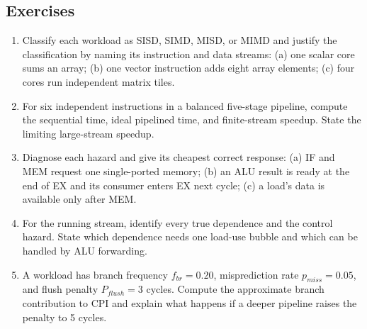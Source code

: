 \documentclass[11pt]{article}
\begin{document}
\subsection*{Exercises}
\begin{enumerate}
  \item Classify each workload as SISD, SIMD, MISD, or MIMD and justify the
        classification by naming its instruction and data streams: (a) one
        scalar core sums an array; (b) one vector instruction adds eight array
        elements; (c) four cores run independent matrix tiles.
  \item For six independent instructions in a balanced five-stage pipeline,
        compute the sequential time, ideal pipelined time, and finite-stream
        speedup. State the limiting large-stream speedup.
  \item Diagnose each hazard and give its cheapest correct response: (a) IF
        and MEM request one single-ported memory; (b) an ALU result is ready at
        the end of EX and its consumer enters EX next cycle; (c) a load's data
        is available only after MEM.
  \item For the running stream, identify every true dependence and the
        control hazard. State which dependence needs one load-use bubble and
        which can be handled by ALU forwarding.
  \item A workload has branch frequency $f_{br}=0.20$, misprediction rate
        $p_{miss}=0.05$, and flush penalty $P_{flush}=3$ cycles. Compute the
        approximate branch contribution to CPI and explain what happens if a
        deeper pipeline raises the penalty to 5 cycles.
\end{enumerate}
\end{document}
